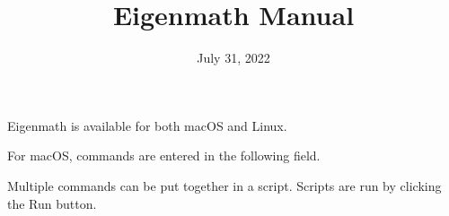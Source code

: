 \documentclass[12pt]{article}
\title{Eigenmath Manual}
\date{July 31, 2022}
\author{}
\begin{document}
\maketitle

\tableofcontents

\newpage

Eigenmath is available for both macOS and Linux.

\bigskip
For macOS, commands are entered in the following field.

\begin{center}
\end{center}

Multiple commands can be put together in a script.
Scripts are run by clicking the Run button.

\begin{center}
\end{center}
\end{document}
